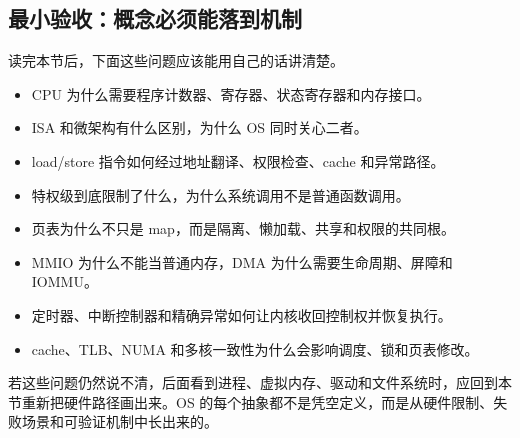 \subsection{最小验收：概念必须能落到机制}

读完本节后，下面这些问题应该能用自己的话讲清楚。

\begin{rubricbox}
\begin{itemize}
\tightlist
\item CPU 为什么需要程序计数器、寄存器、状态寄存器和内存接口。
\item ISA 和微架构有什么区别，为什么 OS 同时关心二者。
\item load/store 指令如何经过地址翻译、权限检查、cache 和异常路径。
\item 特权级到底限制了什么，为什么系统调用不是普通函数调用。
\item 页表为什么不只是 map，而是隔离、懒加载、共享和权限的共同根。
\item MMIO 为什么不能当普通内存，DMA 为什么需要生命周期、屏障和 IOMMU。
\item 定时器、中断控制器和精确异常如何让内核收回控制权并恢复执行。
\item cache、TLB、NUMA 和多核一致性为什么会影响调度、锁和页表修改。
\end{itemize}
\end{rubricbox}

若这些问题仍然说不清，后面看到进程、虚拟内存、驱动和文件系统时，应回到本节重新把硬件路径画出来。OS 的每个抽象都不是凭空定义，而是从硬件限制、失败场景和可验证机制中长出来的。
